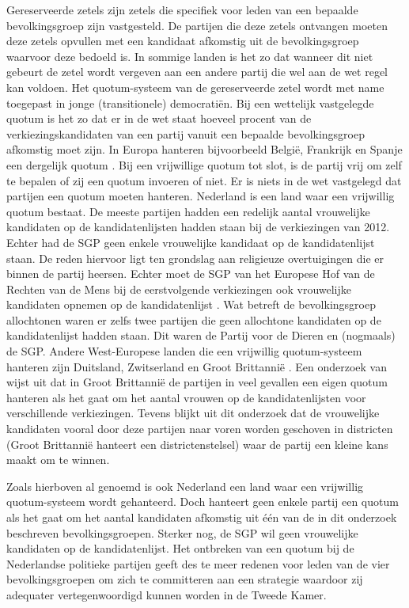 Gereserveerde zetels zijn zetels die specifiek voor leden van een bepaalde bevolkingsgroep zijn vastgesteld. De partijen die deze zetels ontvangen moeten deze zetels opvullen met een kandidaat afkomstig uit de bevolkingsgroep waarvoor deze bedoeld is. In sommige landen is het zo dat wanneer dit niet gebeurt de zetel wordt vergeven aan een andere partij die wel aan de wet regel kan voldoen. Het quotum-systeem van de gereserveerde zetel wordt met name toegepast in jonge (transitionele) democrati\"{e}n. Bij een wettelijk vastgelegde quotum is het zo dat er in de wet staat hoeveel procent van de verkiezingskandidaten van een partij vanuit een bepaalde bevolkingsgroep afkomstig moet zijn. In Europa hanteren bijvoorbeeld Belgi\"{e}, Frankrijk en Spanje een dergelijk quotum
 \citep{council2012positive}. Bij een vrijwillige quotum tot slot, is de partij vrij om zelf te bepalen of zij een quotum invoeren of niet. Er is niets in de wet vastgelegd dat partijen een quotum moeten hanteren. Nederland is een land waar een vrijwillig quotum bestaat. De meeste partijen hadden een redelijk aantal vrouwelijke kandidaten op de kandidatenlijsten hadden staan bij de verkiezingen van 2012. Echter had de SGP geen enkele vrouwelijke kandidaat op de kandidatenlijst staan. De reden hiervoor ligt ten grondslag aan religieuze overtuigingen die er binnen de partij heersen. Echter moet de SGP van het Europese Hof van de Rechten van de Mens bij de eerstvolgende verkiezingen ook vrouwelijke kandidaten opnemen op de kandidatenlijst \citep{Nudef30:online}. Wat betreft de bevolkingsgroep allochtonen waren er zelfs twee partijen die geen allochtone kandidaten op de kandidatenlijst hadden staan. Dit waren de Partij voor de Dieren en (nogmaals) de SGP. Andere West-Europese landen die een vrijwillig quotum-systeem hanteren zijn Duitsland, Zwitserland en Groot Brittannië \citep{Quota47:online}. Een onderzoek van \cite{ryan2010politics} wijst uit dat in Groot Brittannië de partijen in veel gevallen een eigen quotum hanteren als het gaat om het aantal vrouwen op de kandidatenlijsten voor verschillende verkiezingen. Tevens blijkt uit dit onderzoek dat de vrouwelijke kandidaten vooral door deze partijen naar voren worden geschoven in districten (Groot Brittannië hanteert een districtenstelsel) waar de partij een kleine kans maakt om te winnen. 

Zoals hierboven al genoemd is ook Nederland een land waar een vrijwillig quotum-systeem wordt gehanteerd.  Doch hanteert geen enkele partij een quotum als het gaat om het aantal kandidaten afkomstig uit één van de in dit onderzoek beschreven bevolkingsgroepen. Sterker nog, de SGP wil geen vrouwelijke kandidaten op de kandidatenlijst. Het ontbreken van een quotum bij de Nederlandse politieke partijen geeft des te meer redenen voor leden van de vier bevolkingsgroepen om zich te committeren aan een strategie waardoor zij adequater vertegenwoordigd kunnen worden in de Tweede Kamer.

